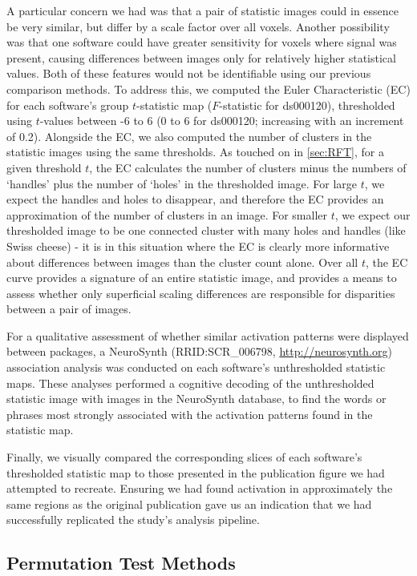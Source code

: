 A particular concern we had was that a pair of statistic images could in essence be very similar, but differ by a scale factor over all voxels. Another possibility was that one software could have greater sensitivity for voxels where signal was present, causing differences between images only for relatively higher statistical values. Both of these features would not be identifiable using our previous comparison methods. To address this, we computed the Euler Characteristic (EC) for each software's group $t$-statistic map ($F$-statistic for ds000120), thresholded using $t$-values between -6 to 6 (0 to 6 for ds000120; increasing with an increment of 0.2). Alongside the EC, we also computed the number of clusters in the statistic images using the same thresholds. As touched on in \ref{sec:RFT}, for a given threshold $t$, the EC calculates the number of clusters minus the numbers of `handles' plus the number of `holes' in the thresholded image. For large $t$, we expect the handles and holes to disappear, and therefore the EC provides an approximation of the number of clusters in an image. For smaller $t$, we expect our thresholded image to be one connected cluster with many holes and handles (like Swiss cheese) - it is in this situation where the EC is clearly more informative about differences between images than the cluster count alone. Over all $t$, the EC curve provides a signature of an entire statistic image, and provides a means to assess whether only  superficial scaling differences are responsible for disparities between a pair of images.

For a qualitative assessment of whether similar activation patterns were displayed between packages, a NeuroSynth (RRID:SCR\_006798, \href{http://neurosynth.org}{http://neurosynth.org}) association analysis was conducted on each software's unthresholded statistic maps.  These analyses performed a cognitive decoding of the unthresholded statistic image with images in the NeuroSynth database, to find the words or phrases most strongly associated with the activation patterns found in the statistic map. 

Finally, we visually compared the corresponding slices of each software's thresholded statistic map to those presented in the publication figure we had attempted to recreate. Ensuring we had found activation in approximately the same regions as the original publication gave us an indication that we had successfully replicated the study's analysis pipeline.

\subsection{Permutation Test Methods}

